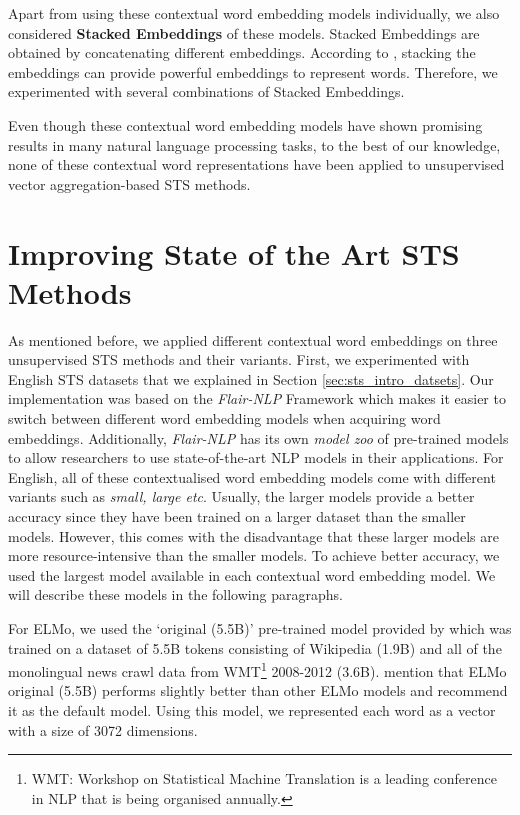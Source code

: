 Apart from using these contextual word embedding models individually, we also considered \textbf{Stacked Embeddings} of these models. Stacked Embeddings are obtained by concatenating different embeddings. According to \textcite{akbik-etal-2018-contextual}, stacking the embeddings can provide powerful embeddings to represent words. Therefore, we experimented with several combinations of Stacked Embeddings.

Even though these contextual word embedding models have shown promising results in many natural language processing tasks, to the best of our knowledge, none of these contextual word representations have been applied to unsupervised vector aggregation-based STS methods.  


\section{Improving State of the Art STS Methods}
\label{sec:state_method}
As mentioned before, we applied different contextual word embeddings on three unsupervised STS methods and their variants. First, we experimented with English STS datasets that we explained in Section \ref{sec:sts_intro_datsets}. Our implementation was based on the \textit{Flair-NLP} Framework \autocite{akbik-etal-2019-flair} which makes it easier to switch between different word embedding models when acquiring word embeddings. Additionally, \textit{Flair-NLP} has its own \textit{model zoo} of pre-trained models to allow researchers to use state-of-the-art NLP models in their applications. For English, all of these contextualised word embedding models come with different variants such as \textit{small, large etc}. Usually, the larger models provide a better accuracy since they have been trained on a larger dataset than the smaller models. However, this comes with the disadvantage that these larger models are more resource-intensive than the smaller models. To achieve better accuracy, we used the largest model available in each contextual word embedding model. We will describe these models in the following paragraphs. 

For ELMo, we used the `original (5.5B)' pre-trained model provided by \textcite{peters-etal-2018-deep} which was trained on a dataset of 5.5B tokens consisting of Wikipedia (1.9B) and all of the monolingual news crawl data from WMT\footnote{WMT: Workshop on Statistical Machine Translation is a leading conference in NLP that is being organised annually.} 2008-2012 (3.6B). \textcite{peters-etal-2018-deep} mention that ELMo original (5.5B) performs slightly better than other ELMo models and recommend it as the default model. Using this model, we represented each word as a vector with a size of 3072 dimensions.

